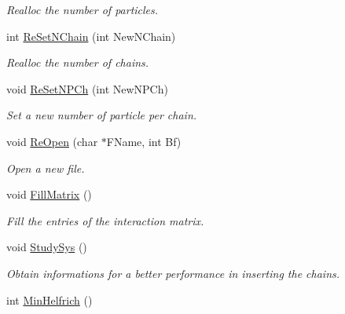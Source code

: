 \begin{DoxyCompactItemize}
\begin{DoxyCompactList}\small\item\em \-Realloc the number of particles. \end{DoxyCompactList}\item 
\hypertarget{classForces_a935982eadb27b11f47553c06e7aa77ba}{int \hyperlink{classForces_a935982eadb27b11f47553c06e7aa77ba}{\-Re\-Set\-N\-Chain} (int \-New\-N\-Chain)}\label{classForces_a935982eadb27b11f47553c06e7aa77ba}

\begin{DoxyCompactList}\small\item\em \-Realloc the number of chains. \end{DoxyCompactList}\item 
\hypertarget{classForces_aa95d72aa125333d83e91047bc8f4319a}{void \hyperlink{classForces_aa95d72aa125333d83e91047bc8f4319a}{\-Re\-Set\-N\-P\-Ch} (int \-New\-N\-P\-Ch)}\label{classForces_aa95d72aa125333d83e91047bc8f4319a}

\begin{DoxyCompactList}\small\item\em \-Set a new number of particle per chain. \end{DoxyCompactList}\item 
\hypertarget{classForces_a3f36144668126bc6bb1c682c5b10b300}{void \hyperlink{classForces_a3f36144668126bc6bb1c682c5b10b300}{\-Re\-Open} (char $\ast$\-F\-Name, int \-Bf)}\label{classForces_a3f36144668126bc6bb1c682c5b10b300}

\begin{DoxyCompactList}\small\item\em \-Open a new file. \end{DoxyCompactList}\item 
\hypertarget{classForces_a5d2e87f58183d51c11ed77483b0d8b4f}{void \hyperlink{classForces_a5d2e87f58183d51c11ed77483b0d8b4f}{\-Fill\-Matrix} ()}\label{classForces_a5d2e87f58183d51c11ed77483b0d8b4f}

\begin{DoxyCompactList}\small\item\em \-Fill the entries of the interaction matrix. \end{DoxyCompactList}\item 
void \hyperlink{classForces_a5404beae7f264277208ee9e55cbea66e}{\-Study\-Sys} ()
\begin{DoxyCompactList}\small\item\em \-Obtain informations for a better performance in inserting the chains. \end{DoxyCompactList}\item 
\hypertarget{classForces_ad3b093268ba213a56fd6350ad4c861f2}{int \hyperlink{classForces_ad3b093268ba213a56fd6350ad4c861f2}{\-Min\-Helfrich} ()}\label{classForces_ad3b093268ba213a56fd6350ad4c861f2}


\end{DoxyCompactItemize}
